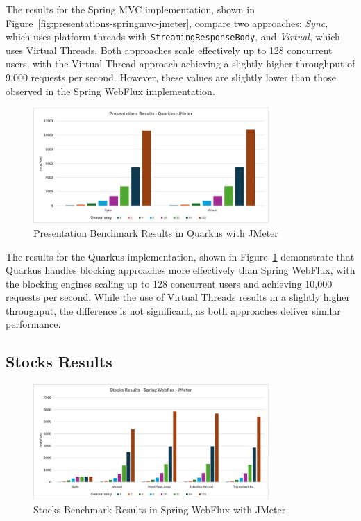 The results for the Spring MVC implementation, shown in
Figure~\ref{fig:presentations-springmvc-jmeter}, compare two approaches:
\textit{Sync}, which uses platform threads with \texttt{StreamingResponseBody},
and \textit{Virtual}, which uses Virtual Threads. Both approaches scale
effectively up to 128 concurrent users, with the Virtual Thread approach
achieving a slightly higher throughput of 9,000 requests per second. However,
these values are slightly lower than those observed in the Spring WebFlux
implementation.

\begin{figure}[h]
     \centering
     \includegraphics[width=0.8\textwidth]{./Graphs/presentations-quarkus-jmeter.png}
     \caption{Presentation Benchmark Results in Quarkus with JMeter}\label{fig:presentations-quarkus-jmeter}
\end{figure}

The results for the Quarkus implementation, shown in
Figure~\ref{fig:presentations-quarkus-jmeter} demonstrate that Quarkus handles
blocking approaches more effectively than Spring WebFlux, with the blocking
engines scaling up to 128 concurrent users and achieving 10,000 requests per
second. While the use of Virtual Threads results in a slightly higher
throughput, the difference is not significant, as both approaches deliver
similar performance.

\subsection{Stocks Results}

\begin{figure}[h]
     \centering
     \includegraphics[width=0.8\textwidth]{./Graphs/stocks-webflux-jmeter.png}
     \caption{Stocks Benchmark Results in Spring WebFlux with JMeter}\label{fig:stocks-webflux-jmeter}
\end{figure}

